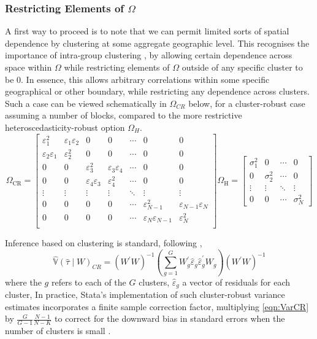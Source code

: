 \documentclass[varwidth,bib]{statapress}
\begin{document}
\subsubsection{Restricting Elements of $\Omega$}
A first way to proceed is to note that we can permit limited sorts of spatial dependence by clustering at some aggregate geographic level.  This recognises the importance of intra-group clustering \citep{Moulton1986}, by allowing certain dependence across space within $\Omega$ while restricting elements of $\Omega$ outside of any specific cluster to be 0. In essence, this allows arbitrary correlations within some specific geographical or other boundary, while restricting any dependence across clusters.  Such a case can be viewed schematically in $\Omega_{CR}$ below, for a cluster-robust case assuming a number of blocks, compared to the more restrictive heteroscedasticity-robust option $\Omega_H$.
\[
\Omega_{\text{CR}} =
\begin{bmatrix}
\varepsilon_1^2 & \varepsilon_1 \varepsilon_2 & 0 & 0 & \cdots & 0 & 0 \\
\varepsilon_2 \varepsilon_1 & \varepsilon_2^2 & 0 & 0 & \cdots & 0 & 0 \\
0 & 0 & \varepsilon_3^2 & \varepsilon_3 \varepsilon_4 & \cdots & 0 & 0 \\
0 & 0 & \varepsilon_4 \varepsilon_3 & \varepsilon_4^2 & \cdots & 0 & 0 \\
\vdots & \vdots & \vdots & \vdots & \ddots & \vdots & \vdots \\
0 & 0 & 0 & 0 & \cdots & \varepsilon_{N-1}^2 & \varepsilon_{N-1} \varepsilon_{N} \\
0 & 0 & 0 & 0 & \cdots & \varepsilon_N \varepsilon_{N-1} & \varepsilon_N^2 \\
\end{bmatrix}
\Omega_{\text{H}} =
\begin{bmatrix}
\sigma_1^2 & 0 & \cdots & 0 \\
0 & \sigma_2^2 & \cdots & 0 \\
\vdots & \vdots & \ddots & \vdots \\
0 & 0 & \cdots & \sigma_N^2
\end{bmatrix}
\]

Inference based on clustering is standard, following \citet{LiangZeger1986}, 
\begin{equation}
\label{eqn:VarCR}
\widehat{\mathbb{V}}(\widehat\tau \mid W)_{CR} = (W^\prime W)^{-1} \left( \sum_{g=1}^G W_g^\prime \widehat\varepsilon_g \widehat\varepsilon_g^\prime W_g \right) (W^\prime W)^{-1}
\end{equation}
where the $g$ refers to each of the $G$ clusters, $\widehat\varepsilon_g$ a vector of residuals for each cluster,  In practice, Stata's implementation of such cluster-robust variance estimates incorporates a finite sample correction factor, multiplying \eqref{eqn:VarCR} by $\frac{G}{G-1}\frac{N-1}{N-K}$ to correct for the downward bias in standard errors when the number of clusters is small \citep{CameronMiller2015,Rogers1993}.
\end{document}
